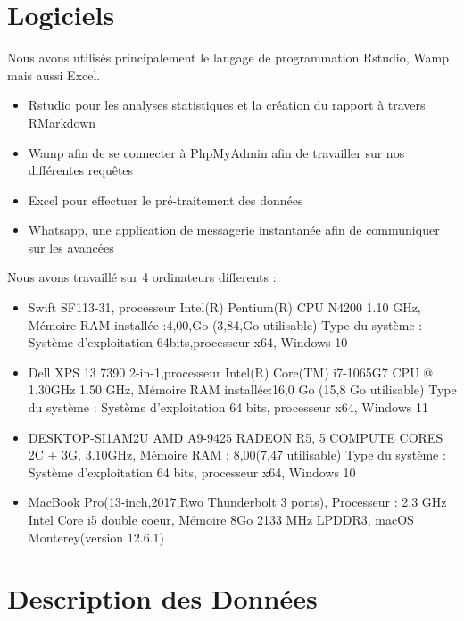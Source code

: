\documentclass[mstat,12pt]{unswthesis}
\begin{document}
\hypertarget{logiciels}{%
\section{Logiciels}\label{logiciels}}

Nous avons utilisés principalement le langage de programmation Rstudio,
Wamp mais aussi Excel.

\begin{itemize}
\tightlist
\item
  Rstudio pour les analyses statistiques et la création du rapport à
  travers RMarkdown
\item
  Wamp afin de se connecter à PhpMyAdmin afin de travailler sur nos
  différentes requêtes
\item
  Excel pour effectuer le pré-traitement des données
\item
  Whatsapp, une application de messagerie instantanée afin de
  communiquer sur les avancées
\end{itemize}

Nous avons travaillé sur 4 ordinateurs differents :

\begin{itemize}
\item
  Swift SF113-31, processeur Intel(R) Pentium(R) CPU N4200 1.10 GHz,
  Mémoire RAM installée :4,00,Go (3,84,Go utilisable) Type du système :
  Système d'exploitation 64bits,processeur x64, Windows 10
\item
  Dell XPS 13 7390 2-in-1,processeur Intel(R) Core(TM) i7-1065G7 CPU @
  1.30GHz 1.50 GHz, Mémoire RAM installée:16,0 Go (15,8 Go utilisable)
  Type du système : Système d'exploitation 64 bits, processeur x64,
  Windows 11
\item
  DESKTOP-SI1AM2U AMD A9-9425 RADEON R5, 5 COMPUTE CORES 2C + 3G,
  3.10GHz, Mémoire RAM : 8,00(7,47 utilisable) Type du système : Système
  d'exploitation 64 bits, processeur x64, Windows 10
\item
  MacBook Pro(13-inch,2017,Rwo Thunderbolt 3 ports), Processeur : 2,3
  GHz Intel Core i5 double coeur, Mémoire 8Go 2133 MHz LPDDR3, macOS
  Monterey(version 12.6.1)
\end{itemize}

\bigskip

\hypertarget{description-des-donnuxe9es}{%
\section{Description des Données}\label{description-des-donnuxe9es}}
\end{document}
